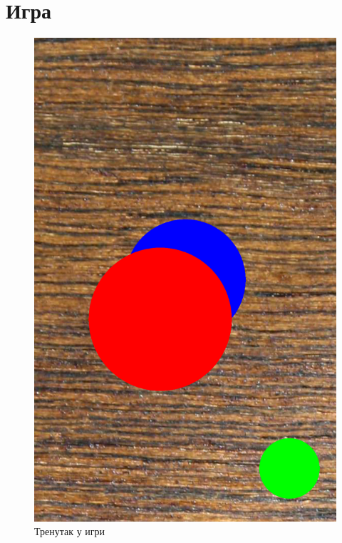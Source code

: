 \section{Игра}\label{UseCases:Game}
\begin{figure}[htb!]
\begin{center}
\includegraphics[scale=.1]{pictures/game/game}
\caption{Тренутак у игри}\label{fig:gameGame}
\end{center}
\end{figure}



